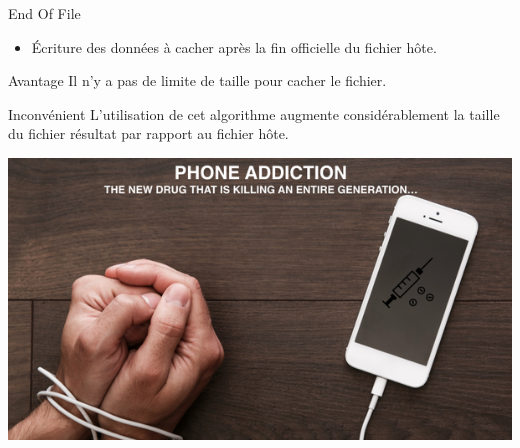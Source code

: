 \documentclass{beamer}
\begin{document}
    \begin{frame}
    
	\begin{block}{End Of File}
	\begin{itemize}
	[circle]
	\item Écriture des données à cacher après la fin officielle du fichier 
	hôte. 
	\end{itemize}
	\end{block}
	
	\begin{exampleblock}{Avantage} 
	Il n'y a pas de limite de taille pour cacher le fichier. 
	\end{exampleblock}
	
	\begin{alertblock}{Inconvénient} 
	L'utilisation de cet algorithme augmente considérablement la taille du 
	fichier résultat par rapport au fichier hôte. 
	\end{alertblock}
	
	\hspace{1cm}
    \includegraphics[scale=0.2]{ANGS3/addiction.png}
    
    \end{frame}
    
\end{document}
